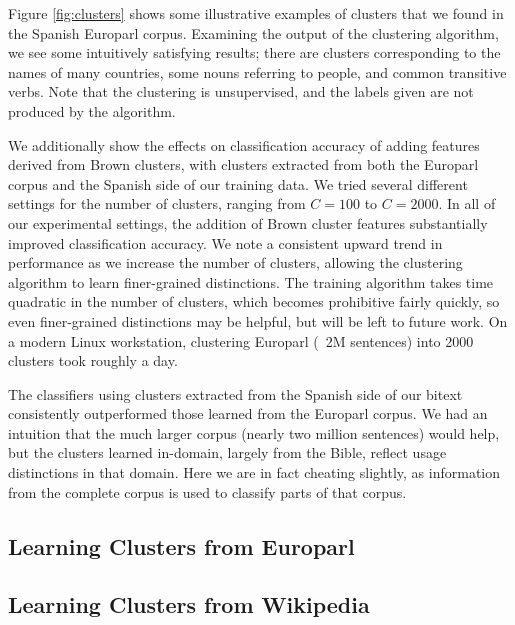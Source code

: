 Figure \ref{fig:clusters} shows some illustrative examples of clusters that
we found in the Spanish Europarl corpus.  Examining the output of the
clustering algorithm, we see some intuitively satisfying results; there are
clusters corresponding to the names of many countries, some nouns referring to
people, and common transitive verbs. Note that the clustering is unsupervised,
and the labels given are not produced by the algorithm.

We additionally show the effects on classification accuracy of adding features
derived from Brown clusters, with clusters extracted from both the Europarl
corpus and the Spanish side of our training data.
We tried several different
settings for the number of clusters, ranging from $C=100$ to $C=2000$.
In all of our experimental settings, the addition of Brown cluster features
substantially improved classification accuracy. We note a consistent upward
trend in performance as we increase the number of clusters, allowing the
clustering algorithm to learn finer-grained distinctions.
The training algorithm takes time quadratic in the number of clusters,
which becomes prohibitive fairly quickly, so even finer-grained distinctions
may be helpful, but will be left to future work. On a modern Linux
workstation, clustering Europarl (~2M sentences) into 2000 clusters took
roughly a day.

The classifiers using clusters extracted from the Spanish side of our bitext
consistently outperformed those learned from the Europarl corpus. We had an
intuition that the much larger corpus (nearly two million sentences) would
help, but the clusters learned in-domain, largely from the Bible, reflect
usage distinctions in that domain. Here we are in fact cheating slightly, as
information from the complete corpus is used to classify parts of that corpus.


\subsection{Learning Clusters from Europarl}

\subsection{Learning Clusters from Wikipedia}


